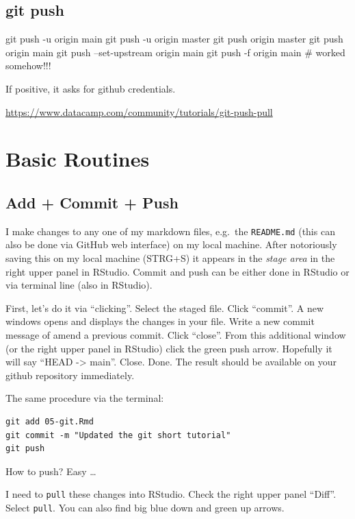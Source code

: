 \documentclass[
]{book}
\begin{document}
\hypertarget{git-push}{%
\subsection{git push}\label{git-push}}

git push -u origin main
git push -u origin master
git push origin master
git push origin main
git push --set-upstream origin main
git push -f origin main \# worked somehow!!!

If positive, it asks for github credentials.

\url{https://www.datacamp.com/community/tutorials/git-push-pull}

\hypertarget{basic-routines}{%
\section{Basic Routines}\label{basic-routines}}

\hypertarget{add-commit-push}{%
\subsection{Add + Commit + Push}\label{add-commit-push}}

I make changes to any one of my markdown files, e.g.~the \texttt{README.md} (this can also be done via GitHub web interface) on my local machine. After notoriously saving this on my local machine (STRG+S) it appears in the \emph{stage area} in the right upper panel in RStudio. Commit and push can be either done in RStudio or via terminal line (also in RStudio).

First, let's do it via ``clicking''. Select the staged file. Click ``commit''. A new windows opens and displays the changes in your file. Write a new commit message of amend a previous commit. Click ``close''. From this additional window (or the right upper panel in RStudio) click the green push arrow. Hopefully it will say ``HEAD -\textgreater{} main''. Close. Done. The result should be available on your github repository immediately.

The same procedure via the terminal:

\begin{verbatim}
git add 05-git.Rmd
git commit -m "Updated the git short tutorial"
git push 
\end{verbatim}

How to push? Easy \ldots{}

I need to \texttt{pull} these changes into RStudio. Check the right upper panel ``Diff''. Select \texttt{pull}. You can also find big blue down and green up arrows.
\end{document}
